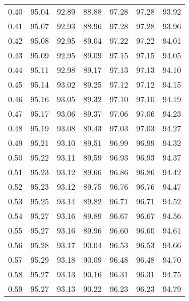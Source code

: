 \begin{tabular}{|c|c|c|c|c|c|c|}
      0.40 &     95.04 &     92.89 &      88.88 &   97.28 &      97.28 &         93.92 \\
      0.41 &     95.07 &     92.93 &      88.96 &   97.28 &      97.28 &         93.96 \\
      0.42 &     95.08 &     92.95 &      89.04 &   97.22 &      97.22 &         94.01 \\
      0.43 &     95.09 &     92.95 &      89.09 &   97.15 &      97.15 &         94.05 \\
      0.44 &     95.11 &     92.98 &      89.17 &   97.13 &      97.13 &         94.10 \\
      0.45 &     95.14 &     93.02 &      89.25 &   97.12 &      97.12 &         94.15 \\
      0.46 &     95.16 &     93.05 &      89.32 &   97.10 &      97.10 &         94.19 \\
      0.47 &     95.17 &     93.06 &      89.37 &   97.06 &      97.06 &         94.23 \\
      0.48 &     95.19 &     93.08 &      89.43 &   97.03 &      97.03 &         94.27 \\
      0.49 &     95.21 &     93.10 &      89.51 &   96.99 &      96.99 &         94.32 \\
      0.50 &     95.22 &     93.11 &      89.59 &   96.93 &      96.93 &         94.37 \\
      0.51 &     95.23 &     93.12 &      89.66 &   96.86 &      96.86 &         94.42 \\
      0.52 &     95.23 &     93.12 &      89.75 &   96.76 &      96.76 &         94.47 \\
      0.53 &     95.25 &     93.14 &      89.82 &   96.71 &      96.71 &         94.52 \\
      0.54 &     95.27 &     93.16 &      89.89 &   96.67 &      96.67 &         94.56 \\
      0.55 &     95.27 &     93.16 &      89.96 &   96.60 &      96.60 &         94.61 \\
      0.56 &     95.28 &     93.17 &      90.04 &   96.53 &      96.53 &         94.66 \\
      0.57 &     95.29 &     93.18 &      90.09 &   96.48 &      96.48 &         94.70 \\
      0.58 &     95.27 &     93.13 &      90.16 &   96.31 &      96.31 &         94.75 \\
      0.59 &     95.27 &     93.13 &      90.22 &   96.23 &      96.23 &         94.79 \\

\end{tabular}
